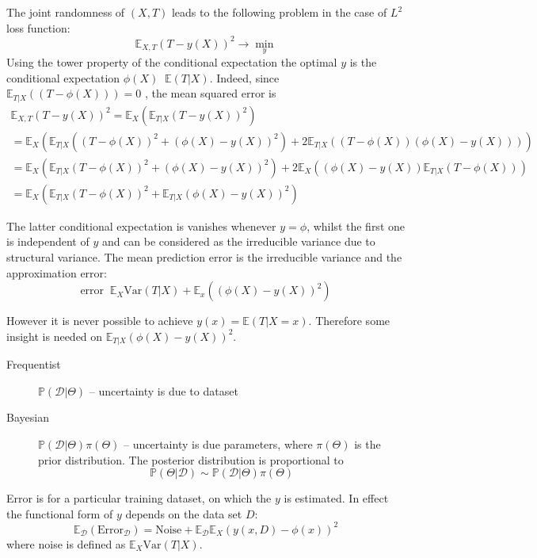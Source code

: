 \documentclass[a4paper]{article}
\newcommand{\brac}[1]{{\left ( #1 \right )}}
\newcommand{\induc}[1]{{\left . #1 \right \vert}}
\newcommand{\Dcal}{\mathcal{D}}
\newcommand{\Ex}[0]{{\mathbb{E}}}
\newcommand{\pr}[0]{{\mathbb{P}}}
\newcommand{\Var}[0]{{\text{Var}}}
\newcommand{\defn}{\mathop{\overset{\Delta}{=}}\nolimits}
\begin{document}
The joint randomness of $(X,T)$ leads to the following problem in the case of $L^2$ loss function:
\[\Ex_{X,T} \brac{T-y(X)}^2 \to \min_y\]
Using the tower property of the conditional expectation the optimal $y$ is the conditional expectation $\phi(X)\defn \Ex\brac{\induc{T}X}$.
Indeed, since $\Ex_{\induc{T}X} \brac{\brac{T-\phi(X)} } = 0$ , the mean squared error is
\begin{align*}
	\Ex_{X,T} \brac{T-y(X)}^2 = \Ex_{X} \brac{\Ex_{\induc{T}X} \brac{T-y(X)}^2 } \\
		= \Ex_X \brac{ \Ex_{\induc{T}X} \brac{ \brac{T-\phi(X)}^2+\brac{\phi(X)-y(X)}^2} + 2 \Ex_{\induc{T}X} \brac{\brac{T-\phi(X)}\brac{\phi(X)-y(X)} }} \\
		= \Ex_X \brac{ \Ex_{\induc{T}X} \brac{T-\phi(X)}^2+\brac{\phi(X)-y(X)}^2 } + 2 \Ex_X \brac{\brac{\phi(X)-y(X)} \Ex_{\induc{T}X} \brac{T-\phi(X)} } \\
		= \Ex_X \brac{ \Ex_{\induc{T}X} \brac{T-\phi(X)}^2 + \Ex_{\induc{T}X} \brac{\phi(X)-y(X)}^2 }
\end{align*}

The latter conditional expectation is vanishes whenever $y=\phi$, whilst the first one is independent of $y$ and can be considered as the irreducible variance due to structural variance.
The mean prediction error is the irreducible variance and the approximation error:
\[\text{error} \defn \Ex_X \Var\brac{\induc{T}X} + \Ex_x \brac{\brac{\phi(X)-y(X)}^2} \]

However it is never possible to achieve $y(x) = \Ex\brac{\induc{T}X=x}$.
Therefore some insight is needed on $\Ex_{\induc{T}X} \brac{\phi(X)-y(X)}^2$.
\begin{description}
	\item[Frequentist] $\pr\brac{\induc{\Dcal}\Theta}$ -- uncertainty is due to dataset
	\item[Bayesian] $\pr\brac{\induc{\Dcal}\Theta} \pi(\Theta)$ -- uncertainty is due parameters, where $\pi(\Theta)$ is the prior distribution.
	The posterior distribution is proportional to
		\[\pr\brac{\induc{\Theta}\Dcal} \sim \pr\brac{\induc{\Dcal}\Theta} \pi(\Theta)\]
\end{description}

Error is for a particular training dataset, on which the $y$ is estimated. In effect the functional form of $y$ depends on the data set $D$:
\[\Ex_\Dcal\brac{\text{Error}_\Dcal} = \text{Noise} + \Ex_\Dcal \Ex_X \brac{ y(x,D)-\phi(x) }^2\]
where noise is defined as $\Ex_X \Var\brac{\induc{T}X}$.
\end{document}
